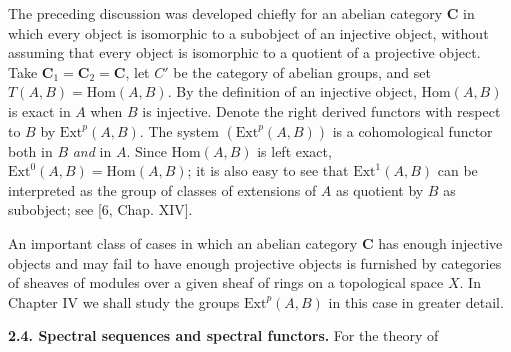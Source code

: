The preceding discussion was developed chiefly for an abelian category $\mathbf{C}$
in which every object is isomorphic to a subobject of an injective object,
without assuming that every object is isomorphic to a quotient of a projective
object. Take $\mathbf{C}_1=\mathbf{C}_2=\mathbf{C}$, let $C'$ be the category of abelian groups, and set
$T(A,B)=\mathrm{Hom}(A,B)$. By the definition of an injective object,
$\mathrm{Hom}(A,B)$ is exact in $A$ when $B$ is injective. Denote the right
derived functors with respect to $B$ by $\mathrm{Ext}^p(A,B)$. The system
$(\mathrm{Ext}^p(A,B))$ is a cohomological functor both in $B$ \textit{and} in $A$.
Since $\mathrm{Hom}(A,B)$ is left exact,
$\mathrm{Ext}^0(A,B)=\mathrm{Hom}(A,B)$; it is also easy to see that
$\mathrm{Ext}^1(A,B)$ can be interpreted as the group of classes of extensions
of $A$ as quotient by $B$ as subobject; see [6, Chap. XIV].

An important class of cases in which an abelian category $\mathbf{C}$ has enough
injective objects and may fail to have enough projective objects is furnished
by categories of sheaves of modules over a given sheaf of rings on a
topological space $X$. In Chapter IV we shall study the groups
$\mathrm{Ext}^p(A,B)$ in this case in greater detail.

\textbf{2.4. Spectral sequences and spectral functors.} For the
theory of

